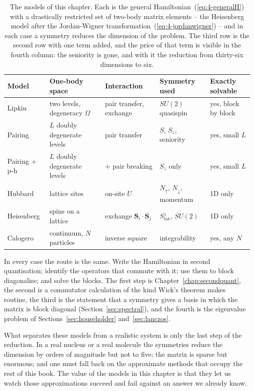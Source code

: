 \begin{table}[h]
\centering
\renewcommand{\arraystretch}{1.3}
\setlength{\tabcolsep}{4pt}
\small
\begin{tabular}{lllll}
\toprule
\textbf{Model} & \textbf{One-body space} & \textbf{Interaction} &
\textbf{Symmetry used} & \textbf{Exactly solvable}\\
\midrule
Lipkin   & two levels, degeneracy $\Omega$ & pair transfer, exchange
         & $SU(2)$ quasispin & yes, block by block\\
Pairing  & $L$ doubly degenerate levels & pair transfer
         & $S$, $S_z$, seniority & yes, small $L$\\
Pairing $+$ p-h & $L$ doubly degenerate levels & $+$ pair breaking
         & $S_z$ only & yes, small $L$\\
Hubbard  & lattice sites & on-site $U$
         & $N_{\uparrow}$, $N_{\downarrow}$, momentum & 1D only\\
Heisenberg & spins on a lattice & exchange $\bm{S}_i\cdot\bm{S}_j$
         & $S^z_{\mathrm{tot}}$, $SU(2)$ & 1D only\\
Calogero & continuum, $N$ particles & inverse square
         & integrability & yes, any $N$\\
\bottomrule
\end{tabular}
\caption{The models of this chapter.  Each is the general
Hamiltonian~(\ref{eq:4-generalH}) with a drastically restricted set of
two-body matrix elements -- the Heisenberg model after the Jordan-Wigner
transformation~(\ref{eq:4-jordanwigner}) -- and in each case a symmetry
reduces the dimension of the problem.  The third row is the second row with
one term added, and the price of that term is visible in the fourth column:
the seniority is gone, and with it the reduction from thirty-six dimensions
to six.}
\label{tab:models}
\end{table}

In every case the route is the same.  Write the Hamiltonian in second
quantisation; identify the operators that commute with it; use them to block
diagonalise; and solve the blocks.  The first step is
Chapter~\ref{chap:secondquant}, the second is a commutator calculation of the
kind Wick's theorem makes routine, the third is the statement that a symmetry
gives a basis in which the matrix is block diagonal
(Section~\ref{sec:spectral}), and the fourth is the eigenvalue problem of
Sections~\ref{sec:householder} and~\ref{sec:lanczos}.

What separates these models from a realistic system is only the last step of
the reduction.  In a real nucleus or a real molecule the symmetries reduce the
dimension by orders of magnitude but not to five; the matrix is sparse but
enormous; and one must fall back on the approximate methods that occupy the
rest of this book.  The value of the models in this chapter is that they let
us watch those approximations succeed and fail against an answer we already
know.

